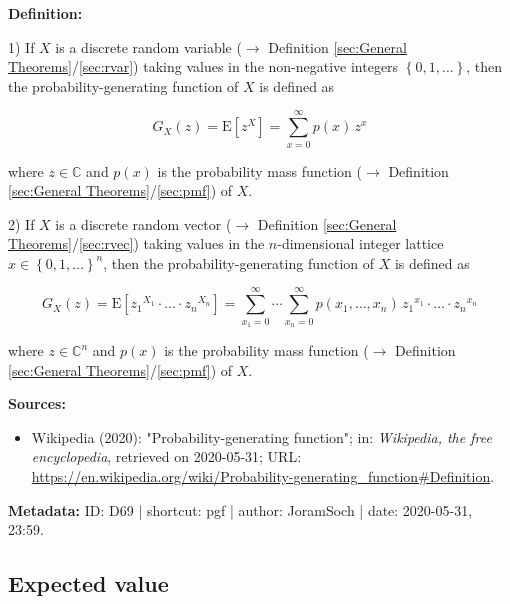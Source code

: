 \documentclass[a4paper,12pt,twoside]{book}
\begin{document}
\textbf{Definition:}

1) If $X$ is a discrete random variable ($\rightarrow$ Definition \ref{sec:General Theorems}/\ref{sec:rvar}) taking values in the non-negative integers $\left\lbrace 0, 1, \ldots \right\rbrace$, then the probability-generating function of $X$ is defined as

\begin{equation} \label{eq:pgf-pgf-var}
G_X(z) = \mathrm{E} \left[ z^X \right] = \sum_{x=0}^{\infty} p(x) \, z^x
\end{equation}

where $z \in \mathbb{C}$ and $p(x)$ is the probability mass function ($\rightarrow$ Definition \ref{sec:General Theorems}/\ref{sec:pmf}) of $X$.

2) If $X$ is a discrete random vector ($\rightarrow$ Definition \ref{sec:General Theorems}/\ref{sec:rvec}) taking values in the $n$-dimensional integer lattice $x \in \left\lbrace 0, 1, \ldots \right\rbrace^n$, then the probability-generating function of $X$ is defined as

\begin{equation} \label{eq:pgf-cgf-vec}
G_X(z) = \mathrm{E} \left[ {z_1}^{X_1} \cdot \ldots \cdot {z_n}^{X_n} \right] = \sum_{x_1=0}^{\infty} \cdots \sum_{x_n=0}^{\infty} p(x_1,\ldots,x_n) \, {z_1}^{x_1} \cdot \ldots \cdot {z_n}^{x_n}
\end{equation}

where $z \in \mathbb{C}^n$ and $p(x)$ is the probability mass function ($\rightarrow$ Definition \ref{sec:General Theorems}/\ref{sec:pmf}) of $X$.


\vspace{1em}
\textbf{Sources:}
\begin{itemize}
\item Wikipedia (2020): "Probability-generating function"; in: \textit{Wikipedia, the free encyclopedia}, retrieved on 2020-05-31; URL: \url{https://en.wikipedia.org/wiki/Probability-generating_function#Definition}.
\end{itemize}


\vspace{1em}
\textbf{Metadata:} ID: D69 | shortcut: pgf | author: JoramSoch | date: 2020-05-31, 23:59.
\vspace{1em}



\subsection{Expected value}
\end{document}
